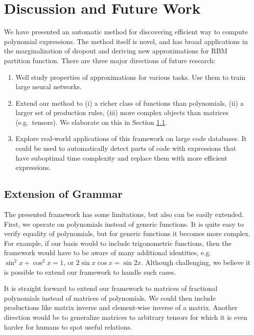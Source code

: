 \section{Discussion and Future Work}

We have presented an automatic method for discovering efficient way to
compute polynomial expressions. The method itself is novel, and
has broad applications in the marginalization of dropout and
deriving new approximations for RBM partition function. There are three
major directions of future research: 

\begin{enumerate}
  \item Well study properties of approximations for various tasks. Use them to
        train large neural networks.
  \item Extend our method to (i) a richer class of functions
    than polynomials, (ii) a larger set of production rules, (iii) more complex
    objects than matrices (e.g.~tensors). We elaborate on this in
    Section \ref{sec:extend}.
\item Explore real-world applications of this framework on large code databases. 
  It could be used to automatically detect parts of code with expressions that have suboptimal 
  time complexity and replace them with more efficient expressions.
\end{enumerate}


\subsection{Extension of Grammar}
\label{sec:extend}
The presented framework has some limitations, but also can be easily extended. First,
we operate on polynomials instead of generic functions. 
It is quite easy to verify equality of polynomials, but for generic functions it becomes more complex.
For example, if our basis would to include trigonometric functions, then the
framework would have to be aware of many additional identities,
e.g. $\sin^2{x} + \cos^2{x} = 1$, or $2\sin x \cos x = \sin
2x$. Although challenging, we believe it is possible to extend our
framework to handle such cases. 

It is straight forward to extend our framework to matrices of fractional
polynomials instead of matrices of polynomials.  We could
then include productions like matrix inverse and element-wise inverse of
a matrix.  Another direction would be to generalize matrices to arbitrary tensors
for which it is even harder for humans to spot useful relations.

